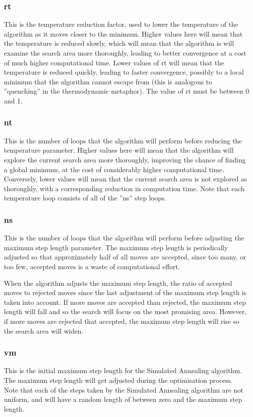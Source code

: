 \documentclass[10pt,twoside]{book}
\begin{document}
\subsubsection{rt}
This is the temperature reduction factor, used to lower the temperature of the algorithm as it moves closer to the minimum.  Higher values here will mean that the temperature is reduced slowly, which will mean that the algorithm is will examine the search area more thoroughly, leading to better convergence at a cost of much higher computational time.  Lower values of rt will mean that the temperature is reduced quickly, leading to faster convergence, possibly to a local minimum that the algorithm cannot escape from (this is analogous to ''quenching'' in the thermodynamic metaphor).  The value of rt must be between 0 and 1.

\subsubsection{nt}
This is the number of loops that the algorithm will perform before reducing the temperature parameter.  Higher values here will mean that the algorithm will explore the current search area more thoroughly, improving the chance of finding a global minimum, at the cost of considerably higher computational time.  Conversely, lower values will mean that the current search area is not explored as thoroughly, with a corresponding reduction in computation time.  Note that each temperature loop consists of all of the ''ns'' step loops.

\subsubsection{ns}
This is the number of loops that the algorithm will perform before adjusting the maximum step length parameter.  The maximum step length is periodically adjusted so that approximately half of all moves are accepted, since too many, or too few, accepted moves is a waste of computational effort.

\bigskip
When the algorithm adjusts the maximum step length, the ratio of accepted moves to rejected moves since the last adjustment of the maximum step length is taken into account.  If more moves are accepted than rejected, the maximum step length will fall and so the search will focus on the most promising area.  However, if more moves are rejected that accepted, the maximum step length will rise so the search area will widen.

\subsubsection{vm}
This is the initial maximum step length for the Simulated Annealing algorithm.  The maximum step length will get adjusted during the optimisation process.  Note that each of the steps taken by the Simulated Annealing algorithm are not uniform, and will have a random length of between zero and the maximum step length.
\end{document}
